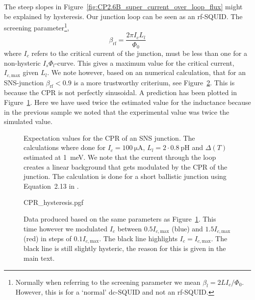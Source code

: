 The steep slopes in Figure~\ref{fig:CP2.6B_super_current_over_loop_flux} might be explained by hysteresis. Our junction loop can be seen as an rf-SQUID\cite{clarkeSQUIDHandbook2004}. The screening parameter\footnote{Normally when referring to the screening parameter we mean $\beta_l = 2LI_c/\Phi_0$. However, this is for a `normal' dc-SQUID and not an rf-SQUID.},
\begin{equation}
	\beta_{\text{rf}} = \frac{2\pi I_c L_l}{\Phi_0}
\end{equation}
where $I_c$ refers to the critical current of the junction, must be less than one for a non-hysteric $I_s\Phi_l$-curve\cite{clarkeSQUIDHandbook2004,frolovMeasurementCurrentPhaseRelation2004}. This gives a maximum value for the critical current, $I_{c,\text{max}}$ given $L_l$. We note however, based on an numerical calculation, that for an SNS-junction $\beta_{\text{rf}} < 0.9$ is a more trustworthy criterium, see Figure~\ref{fig:CPR-hysteresis}. This is because the CPR is not perfectly sinusoidal\cite{vermeerSTMbasedScanningSQUID2021,likharevSuperconductingWeakLinks1979}. A prediction has been plotted in Figure~\ref{fig:CP3.5A-analytical-prediction}. Here we have used twice the estimated value for the inductance because in the previous sample we noted that the experimental value was twice the simulated value.

\begin{figure}[ht!]
	
	\caption{Expectation values for the CPR of an SNS junction. The calculations where done for $I_c=\qty{100}{\micro\ampere}$, $L_l=2 \cdot \qty{0.8}{\pico\henry}$ and $\Delta(T)$ estimated at \qty{1}{\milli\electronvolt}. We note that the current through the loop creates a linear background that gets modulated by the CPR of the junction. The calculation is done for a short ballistic junction using Equation~2.13 in \cite{vermeerSTMbasedScanningSQUID2021}.}
	\label{fig:CP3.5A-analytical-prediction}
\end{figure}

\begin{figure}
	\centering
	{CPR_hysteresis.pgf}
	\caption{Data produced based on the same parameters as Figure~\ref{fig:CP3.5A-analytical-prediction}. This time however we modulated $I_c$ between $0.5I_{c,\text{max}}$ (blue) and $1.5I_{c,\text{max}}$ (red) in steps of $0.1I_{c,\text{max}}$. The black line highlights $I_c=I_{c,\text{max}}$. The black line is still slightly hysteric, the reason for this is given in the main text.}
	\label{fig:CPR-hysteresis}
\end{figure}

